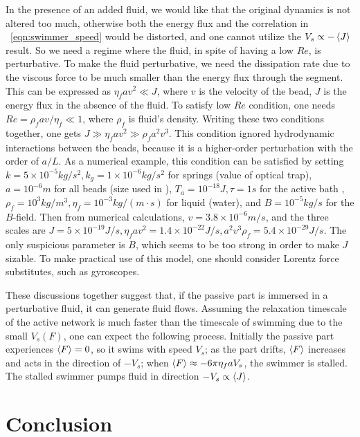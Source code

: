 \documentclass[
 preprint,
 preprintnumbers,
 amsmath,amssymb,
 aps,
 pre,
 longbibliography,
 superscriptaddress,
 10pt, twocolumn
]{revtex4-1}
\begin{document}
In the presence of an added fluid, we would like that the original dynamics is not altered too much, otherwise both the energy flux and the correlation in \eqnname~\eqref{eqn:swimmer_speed} would be distorted, and one cannot utilize the $V_s \propto -\expval{J}$ result.
So we need a regime where the fluid, in spite of having a low $Re$, is perturbative.
To make the fluid perturbative, we need the dissipation rate due to the viscous force to be much smaller than the energy flux through the segment. This can be expressed as $\eta_f a v^2 \ll J$, where $v$ is the velocity of the bead, $J$ is the energy flux in the absence of the fluid.
To satisfy low $Re$ condition, one needs $Re = \rho_f a v /\eta_f \ll 1$, where $\rho_f$ is fluid's density.
Writing these two conditions together, one gets $J \gg \eta_f a v^2 \gg \rho_f a^2 v^3$.
This condition ignored hydrodynamic interactions between the beads, because it is a higher-order perturbation with the order of $a/L$.
As a numerical example, this condition can be satisfied by setting $k=5\times 10^{-5} kg/s^2, k_g=1\times 10^{-6} kg/s^2$ for springs (value of optical trap), $a=10^{-6}m$ for all beads (size used in \cite{Leoni2009BasicSwimmer}), $T_a=10^{-18} J, \tau=1s$ for the active bath \cite{Wu2000ParticleDiffusion}, $\rho_f=10^3kg/m^3, \eta_f=10^{-3}kg/(m\cdot s)$ for liquid (water), and $B=10^{-5} kg/s$ for the $B$-field.
Then from numerical calculations, $v=3.8\times 10^{-6}m/s$, and the three scales are $J=5\times 10^{-19}J/s, \eta_f av^2=1.4\times 10^{-22}J/s, a^2v^3\rho_f=5.4\times 10^{-29}J/s$.
The only suspicious parameter is $B$, which seems to be too strong in order to make $J$ sizable. To make practical use of this model, one should consider Lorentz force substitutes, such as gyroscopes.

These discussions together suggest that, if the passive part is immersed in a perturbative fluid, it can generate fluid flows.
Assuming the relaxation timescale of the active network is much faster than the timescale of swimming due to the small $V_s(F)$, one can expect the following process. Initially the passive part experiences $\expval{F}=0$, so it swims with speed $V_s$; as the part drifts, $\expval{F}$ increases and acts in the direction of $-V_s$; when $\expval{F} \approx -6\pi\eta_f a V_s$, the swimmer is stalled. The stalled swimmer pumps fluid in direction $-V_s \propto \expval{J}$.


\section{Conclusion} \label{sec:conclusion}
\end{document}
